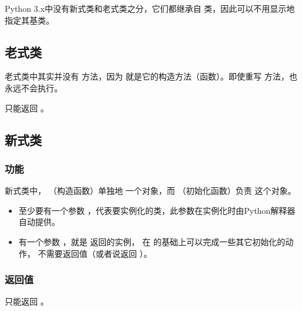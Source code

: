 \documentclass[letterpaper,10pt,english]{sphinxmanual}
\begin{document}
Python 3.x中没有新式类和老式类之分，它们都继承自  类，因此可以不用显示地指定其基类。


\subsection{老式类}
\label{\detokenize{python/16_newInit:id2}}
老式类中其实并没有  方法，因为  就是它的构造方法（函数）。即使重写  方法，也永远不会执行。

 只能返回 。


\subsection{新式类}
\label{\detokenize{python/16_newInit:id3}}

\subsubsection{功能}
\label{\detokenize{python/16_newInit:id4}}
新式类中， （构造函数）单独地  一个对象，而  （初始化函数）负责  这个对象。
\begin{itemize}
\item {} 
 至少要有一个参数 ，代表要实例化的类，此参数在实例化时由Python解释器自动提供。

\item {} 
 有一个参数 ，就是  返回的实例， 在  的基础上可以完成一些其它初始化的动作， 不需要返回值（或者说返回  ）。

\end{itemize}


\subsubsection{返回值}
\label{\detokenize{python/16_newInit:id5}}
 只能返回  。
\end{document}
